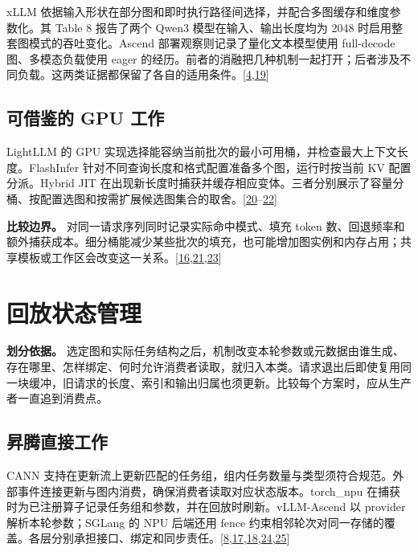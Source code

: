 \documentclass[
  UTF8,
  zihao=5]{ctexart}
\begin{document}
xLLM
依据输入形状在部分图和即时执行路径间选择，并配合多图缓存和维度参数化。其
Table 8 报告了两个 Qwen3 模型在输入、输出长度均为 2048
时启用整套图模式的吞吐变化。Ascend 部署观察则记录了量化文本模型使用
full-decode 图、多模态负载使用 eager
的经历。前者的消融把几种机制一起打开；后者涉及不同负载。这两类证据都保留了各自的适用条件。{[}\protect\hyperlink{ref-liu2025xllm}{4},\protect\hyperlink{ref-yu2026ascendfield}{19}{]}

\hypertarget{ux53efux501fux9274ux7684-gpu-ux5de5ux4f5c-1}{%
\subsection{可借鉴的 GPU
工作}\label{ux53efux501fux9274ux7684-gpu-ux5de5ux4f5c-1}}

LightLLM 的 GPU
实现选择能容纳当前批次的最小可用桶，并检查最大上下文长度。FlashInfer
针对不同查询长度和格式配置准备多个图，运行时按当前 KV 配置分派。Hybrid
JIT
在出现新长度时捕获并缓存相应变体。三者分别展示了容量分桶、按配置选图和按需扩展候选图集合的取舍。{[}\protect\hyperlink{ref-lightllm2026code}{20}--\protect\hyperlink{ref-yadav2026hybridpreprint}{22}{]}

\textbf{比较边界。} 对同一请求序列同时记录实际命中模式、填充 token
数、回退频率和额外捕获成本。细分桶能减少某些批次的填充，也可能增加图实例和内存占用；共享模板或工作区会改变这一关系。{[}\protect\hyperlink{ref-vllmascendmode}{16},\protect\hyperlink{ref-ye2025flashinfer}{21},\protect\hyperlink{ref-liu2026foundry}{23}{]}

\hypertarget{replay-state}{%
\section{回放状态管理}\label{replay-state}}

\textbf{划分依据。}
选定图和实际任务结构之后，机制改变本轮参数或元数据由谁生成、存在哪里、怎样绑定、何时允许消费者读取，就归入本类。请求退出后即使复用同一块缓冲，旧请求的长度、索引和输出归属也须更新。比较每个方案时，应从生产者一直追到消费点。

\hypertarget{ux6607ux817eux76f4ux63a5ux5de5ux4f5c-2}{%
\subsection{昇腾直接工作}\label{ux6607ux817eux76f4ux63a5ux5de5ux4f5c-2}}

CANN
支持在更新流上更新匹配的任务组，组内任务数量与类型须符合规范。外部事件连接更新与图内消费，确保消费者读取对应状态版本。torch\_npu
在捕获时为已注册算子记录任务组和参数，并在回放时刷新。vLLM-Ascend 以
provider 解析本轮参数；SGLang 的 NPU 后端还用 fence
约束相邻轮次对同一存储的覆盖。各层分别承担接口、绑定和同步责任。{[}\protect\hyperlink{ref-cann910update}{8},\protect\hyperlink{ref-vllmascend2026impl}{17},\protect\hyperlink{ref-sglang2026impl}{18},\protect\hyperlink{ref-cann850updateapi}{24},\protect\hyperlink{ref-torchnpu2026graphs}{25}{]}
\end{document}
